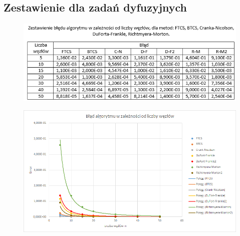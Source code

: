 \subsection{Zestawienie dla zadań dyfuzyjnych}
\begin{figure}[!ht]
	\begin{center}
		\includegraphics[width=1\textwidth]{Lab7/charts/zestawienie.png}
	\end{center}
\end{figure}

\begin{figure}[!ht]
	\begin{center}
		\includegraphics[width=1\textwidth]{Lab7/charts/zestawienie_wykres.png}
	\end{center}
\end{figure}